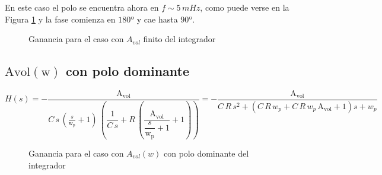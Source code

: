 \documentclass[11pt, a4paper]{article}
\begin{document}
En este caso el polo se encuentra ahora en $f \sim 5 \, mHz$, como puede verse en la Figura \ref{avolfinitointegrador} y la fase comienza en $180º$ y cae hasta $90º$.

\begin{figure}[H]
	\begin{center}
		\caption{Ganancia para el caso con $A_{vol}$ finito del integrador}
		\label{avolfinitointegrador}
	\end{center}
\end{figure}

\subsection{$\mathrm{A{vol}(w)}$ con polo dominante}
\begin{equation}
H(s)= -\frac{\mathrm{A_{vol}}}{C\,s\,\left(\frac{s}{\mathrm{w_p}}+1\right)\,\left(\dfrac{1}{C\,s}+R\,\left(\dfrac{\mathrm{A_{vol}}}{\dfrac{s}{\mathrm{w_p}}+1}+1\right)\right)}
= - \dfrac{\mathrm{A_{vol}}}{C\,R\,s^2+(C\,R\,w_p+C\,R\,w_p\,\mathrm{A_{vol}}+1)s+w_p}
\end{equation}

\begin{figure}[H]
	\begin{center}
		\caption{Ganancia para el caso con $A_{vol}(w)$ con polo dominante del integrador}
		\label{avolpolodominanteintegrador}
	\end{center}
\end{figure}
\end{document}
